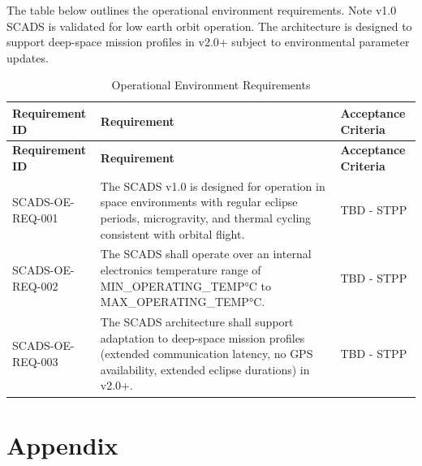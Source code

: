 \documentclass{article}
\begin{document}
        The table below outlines the operational environment requirements. Note
        v1.0 SCADS is validated for low earth orbit operation. The architecture 
        is designed to support deep-space mission profiles in v2.0+ subject to 
        environmental parameter updates.

        \renewcommand{\arraystretch}{1.4}
        \begin{longtable}{|l|p{9cm}|p{5cm}|}
            \caption{Operational Environment Requirements} \\
            \hline
            \textbf{Requirement ID} & \textbf{Requirement} & 
            \textbf{Acceptance Criteria} \\ \hline
            \endfirsthead

            \hline
            \textbf{Requirement ID} & \textbf{Requirement} & 
            \textbf{Acceptance Criteria} \\ \hline
            \endhead
            \hline
            \endfoot
            SCADS-OE-REQ-001 & The SCADS v1.0 is designed for operation in 
                               space environments with regular eclipse periods, 
                               microgravity, and thermal cycling consistent 
                               with orbital flight.
                             & TBD - STPP \\ \hline
            SCADS-OE-REQ-002 & The SCADS shall operate over an internal 
                               electronics temperature range of
                               MIN\_OPERATING\_TEMP°C to MAX\_OPERATING\_TEMP°C. 
                             & TBD - STPP \\ \hline
            SCADS-OE-REQ-003 & The SCADS architecture shall support adaptation 
                               to deep-space mission profiles (extended 
                               communication latency, no GPS availability, 
                               extended eclipse durations) in v2.0+.
                             & TBD - STPP \\ \hline
        \end{longtable}

    \section{Appendix}\label{sec:appendix}
\end{document}
